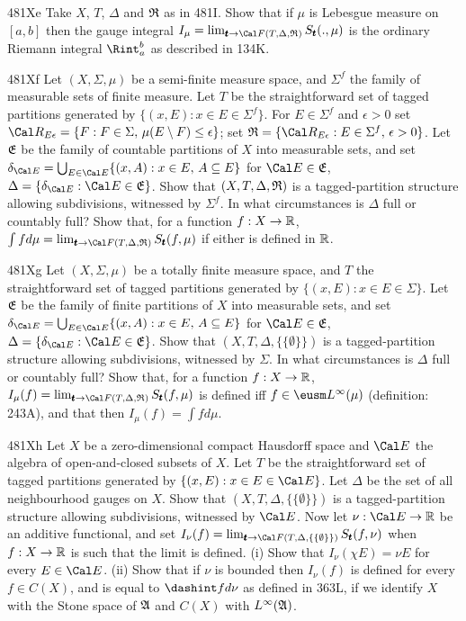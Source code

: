 {\sqheader 481Xe Take $X$, $T$, $\Delta$ and $\frak R$ as in 481I.   Show
that if $\mu$ is Lebesgue measure on $[a,b]$ then the gauge integral
$I_{\mu}=\lim_{\pmb{t}\to\Cal F(T,\Delta,\frak R)}S_{\pmb{t}}(.,\mu)$ is
the ordinary Riemann integral $\Rint_a^b$ as described in
134K.   

\sqheader 481Xf Let $(X,\Sigma,\mu)$ be a semi-finite measure space, and
$\Sigma^f$ the family of measurable sets of finite measure.   Let
$T$ be the straightforward set of tagged partitions generated by
$\{(x,E):x\in E\in\Sigma^f\}$.   For $E\in\Sigma^f$ and $\epsilon>0$ set
$\Cal R_{E\epsilon}=\{F:F\in\Sigma,\,\mu(E\setminus F)\le\epsilon\}$;
set $\frak R=\{\Cal R_{E\epsilon}:E\in\Sigma^f,\,\epsilon>0\}$.   Let
$\frak E$ be the family of countable partitions of $X$ into measurable
sets, and set
$\delta_{\Cal E}=\bigcup_{E\in\Cal E}\{(x,A):x\in E,\,A\subseteq E\}$
for $\Cal E\in\frak E$,
$\Delta=\{\delta_{\Cal E}:\Cal E\in\frak E\}$.   Show that
$(X,T,\Delta,\frak R)$ is a
tagged-partition structure allowing subdivisions, witnessed by
$\Sigma^f$.      In what circumstances is
$\Delta$ full or countably full?
Show that, for a function $f:X\to\Bbb R$,
$\int fd\mu=\lim_{\pmb{t}\to\Cal F(T,\Delta,\frak R)}S_{\pmb{t}}(f,\mu)$
if either is defined in $\Bbb R$.   

\spheader 481Xg Let $(X,\Sigma,\mu)$ be a totally finite measure space,
and $T$ the straightforward set of tagged partitions generated by
$\{(x,E):x\in E\in\Sigma\}$.   Let $\frak E$ be the family of finite
partitions of $X$ into measurable sets, and set
$\delta_{\Cal E}=\bigcup_{E\in\Cal E}\{(x,A):x\in E,\,A\subseteq E\}$
for $\Cal E\in\frak E$, $\Delta=\{\delta_{\Cal E}:\Cal E\in\frak E\}$.
Show that $(X,T,\Delta,\{\{\emptyset\}\})$ is a
tagged-partition structure allowing subdivisions, witnessed by $\Sigma$.
In what circumstances is
$\Delta$ full or countably full?
Show that, for a
function $f:X\to\Bbb R$,
$I_{\mu}(f)=\lim_{\pmb{t}\to\Cal F(T,\Delta,\frak R)}S_{\pmb{t}}(f,\mu)$
is defined iff $f\in\eusm L^{\infty}(\mu)$ (definition:  243A), and
that then $I_{\mu}(f)=\int fd\mu$.

\spheader 481Xh Let $X$ be a zero-dimensional compact Hausdorff space
and $\Cal E$ the algebra of open-and-closed subsets of $X$.   Let $T$ be
the straightforward set of tagged partitions generated by
$\{(x,E):x\in E\in\Cal E\}$.   Let
$\Delta$ be the set of all neighbourhood gauges on $X$.   Show that
$(X,T,\Delta,\{\{\emptyset\}\})$ is a tagged-partition structure
allowing subdivisions, witnessed by $\Cal E$.   Now let
$\nu:\Cal E\to\Bbb R$ be an additive functional, and set $I_{\nu}(f)
=\lim_{\pmb{t}\to\Cal F(T,\Delta,\{\{\emptyset\}\})}
S_{\pmb{t}}(f,\nu)$ when $f:X\to\Bbb R$ is such that the limit is defined.   (i) Show that $I_{\nu}(\chi E)=\nu E$ for every $E\in\Cal E$.
(ii) Show that if $\nu$ is bounded then $I_{\nu}(f)$ is defined for every
$f\in C(X)$, and is equal to $\dashint fd\nu$ as defined in 363L, if we
identify $X$ with the Stone space of $\frak A$ and $C(X)$ with
$L^{\infty}(\frak A)$.

}
